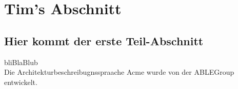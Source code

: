 \section{Tim's Abschnitt}\label{Tim}
\subsection{Hier kommt der erste Teil-Abschnitt }
bliBlaBlub\\
Die Architekturbeschreibugnsspraache Acme wurde von der ABLEGroup \cite{ABLEGroupHomePage-2018-10-12} entwickelt.